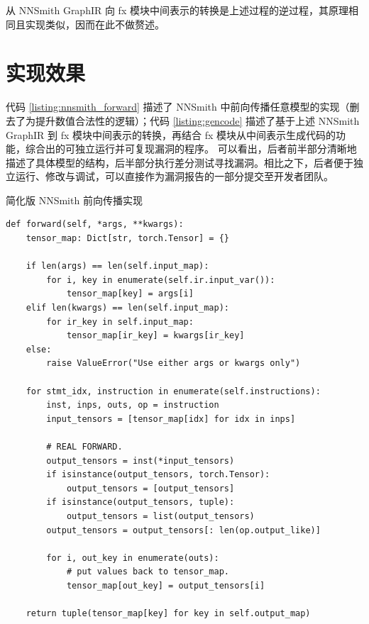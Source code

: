 从 NNSmith GraphIR 向 fx 模块中间表示的转换是上述过程的逆过程，其原理相同且实现类似，因而在此不做赘述。

\section{实现效果}

代码 \ref{listing:nnsmith_forward} 描述了 NNSmith 中前向传播任意模型的实现（删去了为提升数值合法性的逻辑）；代码 \ref{listing:gencode} 描述了基于上述 NNSmith GraphIR 到 fx 模块中间表示的转换，再结合 fx 模块从中间表示生成代码的功能，综合出的可独立运行并可复现漏洞的程序。
可以看出，后者前半部分清晰地描述了具体模型的结构，后半部分执行差分测试寻找漏洞。相比之下，后者便于独立运行、修改与调试，可以直接作为漏洞报告的一部分提交至开发者团队。

\begin{listing}[]
    \caption{简化版 NNSmith 前向传播实现}
    \label{listing:nnsmith_forward}
\begin{verbatim}
def forward(self, *args, **kwargs):
    tensor_map: Dict[str, torch.Tensor] = {}

    if len(args) == len(self.input_map):
        for i, key in enumerate(self.ir.input_var()):
            tensor_map[key] = args[i]
    elif len(kwargs) == len(self.input_map):
        for ir_key in self.input_map:
            tensor_map[ir_key] = kwargs[ir_key]
    else:
        raise ValueError("Use either args or kwargs only")

    for stmt_idx, instruction in enumerate(self.instructions):
        inst, inps, outs, op = instruction
        input_tensors = [tensor_map[idx] for idx in inps]

        # REAL FORWARD.
        output_tensors = inst(*input_tensors)
        if isinstance(output_tensors, torch.Tensor):
            output_tensors = [output_tensors]
        if isinstance(output_tensors, tuple):
            output_tensors = list(output_tensors)
        output_tensors = output_tensors[: len(op.output_like)]

        for i, out_key in enumerate(outs):
            # put values back to tensor_map.
            tensor_map[out_key] = output_tensors[i]
            
    return tuple(tensor_map[key] for key in self.output_map)
\end{verbatim}
\end{listing}


